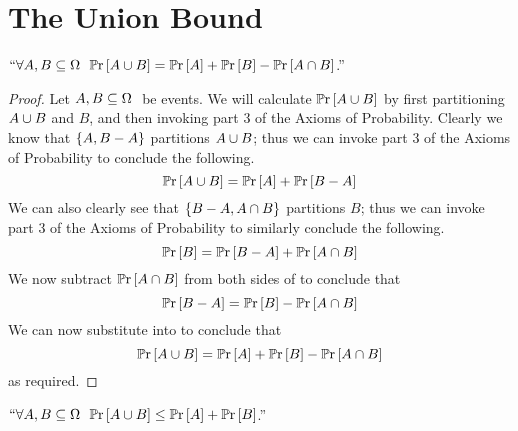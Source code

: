     \section{The Union Bound}
        \begin{theorem}
            $``\forall \subs{A, B}{\Omega} \ \pr{\union{A}{B}} = \pr{A} + \pr{B} - \pr{\intersect{A}{B}}$.''
            \label{Pr union Theorem}
        \end{theorem}
        \begin{proof}
            Let $A, B \subseteq \Omega \ $ be events. We will calculate $\mathbb{P}\mathrm{r} \left[A \cup B\right]$
            by first partitioning $A \cup B$ and $B$, and then invoking part 3 of the Axioms
            of Probability. Clearly we know that $\left\{A, B - A\right\}$ partitions $A \cup B$;
            thus we can invoke part 3 of the Axioms of Probability to conclude the following.
            \begin{equation}
                \mathbb{P}\mathrm{r} \left[A \cup B\right] = \mathbb{P}\mathrm{r} \left[A\right] + \mathbb{P}\mathrm{r} \left[B - A\right]
                \label{Pr union equation 1}
            \end{equation}
            We can also clearly see that $\left\{B - A, A \cap B\right\}$ partitions $B$;
            thus we can invoke part 3 of the Axioms of Probability to similarly conclude the following.
            \begin{equation}
                \mathbb{P}\mathrm{r} \left[B\right] = \mathbb{P}\mathrm{r} \left[B - A\right] + \mathbb{P}\mathrm{r} \left[A \cap B\right]
                \label{Pr union equation 2}
            \end{equation}
            We now subtract $\mathbb{P}\mathrm{r} \left[A \cap B\right]$ from both sides of 
            to conclude that
            \begin{equation}
                \mathbb{P}\mathrm{r} \left[B - A\right] = \mathbb{P}\mathrm{r} \left[B\right] -  \mathbb{P}\mathrm{r} \left[A \cap B\right]
                \label{Pr union equation 3}
            \end{equation}
            We can now substitute  into 
            to conclude that
            \[
                \mathbb{P}\mathrm{r} \left[A \cup B\right] = \mathbb{P}\mathrm{r} \left[A\right] + \mathbb{P}\mathrm{r} \left[B\right] - \mathbb{P}\mathrm{r} \left[A \cap B\right]
            \]
            as required. \QED
        \end{proof}
        \begin{corollary}
            $``\forall \subs{A, B}{\Omega} \ \pr{\union{A}{B}} \le \pr{A} + \pr{B}$.''
            \label{Union Bound n = 2}
        \end{corollary}
